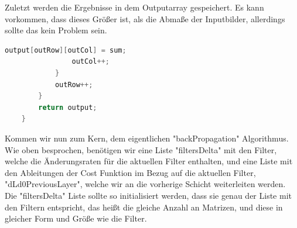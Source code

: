 \documentclass[12pt]{article}
\begin{document}
Zuletzt werden die Ergebnisse in dem Outputarray gespeichert. Es kann vorkommen, dass dieses Größer ist, als die Abmaße der Inputbilder, allerdings sollte das kein Problem sein. 
\begin{lstlisting}[language=Java]
                output[outRow][outCol] = sum;
                outCol++;
            }
            outRow++;
        }
        return output;
    }
\end{lstlisting}

Kommen wir nun zum Kern, dem eigentlichen "backPropagation" Algorithmus. Wie oben besprochen, benötigen wir eine Liste "filtersDelta" mit den Filter, welche die Änderungsraten für die aktuellen Filter enthalten, und eine Liste mit den Ableitungen der Cost Funktion im Bezug auf die aktuellen Filter, "dLd0PreviousLayer", welche wir an die vorherige Schicht weiterleiten werden.
Die "filtersDelta" Liste sollte so initialisiert werden, dass sie genau der Liste mit den Filtern entspricht, das heißt die gleiche Anzahl an Matrizen, und diese in gleicher Form und Größe wie die Filter.
\end{document}
